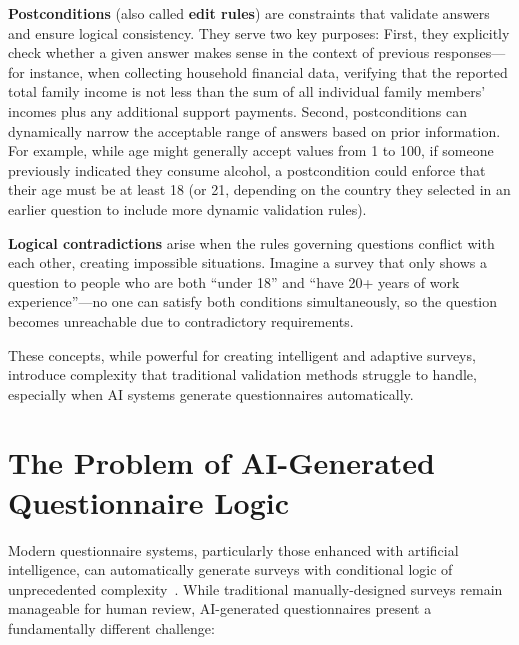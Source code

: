 \textbf{Postconditions} (also called \textbf{edit rules}) are constraints that validate answers and ensure logical consistency. They serve two key purposes: First, they explicitly check whether a given answer makes sense in the context of previous responses—for instance, when collecting household financial data, verifying that the reported total family income is not less than the sum of all individual family members' incomes plus any additional support payments. Second, postconditions can dynamically narrow the acceptable range of answers based on prior information. For example, while age might generally accept values from 1 to 100, if someone previously indicated they consume alcohol, a postcondition could enforce that their age must be at least 18 (or 21, depending on the country they selected in an earlier question to include more dynamic validation rules).

\textbf{Logical contradictions} arise when the rules governing questions conflict with each other, creating impossible situations. Imagine a survey that only shows a question to people who are both ``under 18'' and ``have 20+ years of work experience''—no one can satisfy both conditions simultaneously, so the question becomes unreachable due to contradictory requirements.

These concepts, while powerful for creating intelligent and adaptive surveys, introduce complexity that traditional validation methods struggle to handle, especially when AI systems generate questionnaires automatically.

\section{The Problem of AI-Generated Questionnaire Logic}

Modern questionnaire systems, particularly those enhanced with artificial intelligence, can automatically generate surveys with conditional logic of unprecedented complexity~\cite{olivos2024chatgptest}. While traditional manually-designed surveys remain manageable for human review, AI-generated questionnaires present a fundamentally different challenge:

